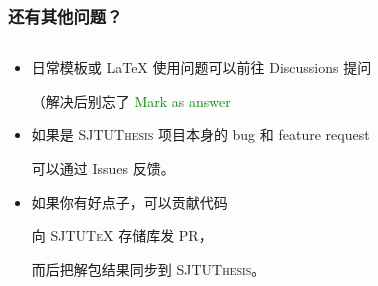\begin{frame}
  \frametitle{还有其他问题？}
  \begin{columns}
    \begin{column}{0.73\textwidth}
      \begin{itemize}
        \item[{\faComment*[regular]}] 日常模板或 \LaTeX{} 使用问题可以前往 Discussions  提问

        （解决后别忘了 \textcolor{green}{\faCheckCircle{} Mark as answer}
        \item[{\faDotCircle[regular]}] 如果是 \textsc{SJTUThesis} 项目本身的 bug 和 feature request

        可以通过 Issues  反馈。
        \item[{\faCodeBranch}] 如果你有好点子，可以贡献代码

          向 \textsc{SJTU\TeX{}}  存储库发 PR，\par
          而后把解包结果同步到 \textsc{SJTUThesis}。
        

\end{itemize}
\end{column}
\end{columns}
\end{frame}
